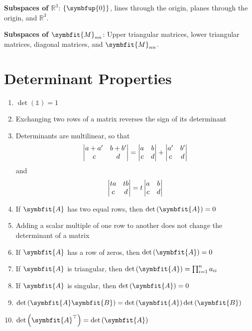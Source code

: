 \documentclass{article}
\begin{document}
\begin{multicols*}{2}
    \textbf{Subspaces of \(\mathbb{R}^3\)}: \(\left\{ \symbfup{0} \right\}\),
    lines through the origin, planes through the origin, and \(\mathbb{R}^3\).

    \textbf{Subspaces of \(\symbfit{M}_{nn}\)}: Upper triangular matrices,
    lower triangular matrices, diagonal matrices, and \(\symbfit{M}_{nn}\).
    \section*{Determinant Properties}
    \begin{enumerate}
        \item \(\det{\left( \mathbb{1} \right)}=1\)
        \item Exchanging two rows of a matrix reverses the sign of its determinant
        \item Determinants are multilinear, so that
              \begin{equation*}
                  \mdet{a+a' & b+b' \\ c & d}
                  = \mdet{a & b \\ c & d}+\mdet{a' & b' \\ c & d}
              \end{equation*}
              and
              \begin{equation*}
                  \mdet{ta & tb \\ c & d}=t\mdet{a & b \\ c & d}
              \end{equation*}
        \item If \(\symbfit{A}\) has two equal rows, then \(\det{\left( \symbfit{A} \right)}=0\)
        \item Adding a scalar multiple of one row to another does not change the determinant of a matrix
        \item If \(\symbfit{A}\) has a row of zeros, then \(\det{\left( \symbfit{A} \right)}=0\)
        \item If \(\symbfit{A}\) is triangular, then \(\det{\left( \symbfit{A} \right)}=\prod_{i=1}^{n} a_{ii}\)
        \item If \(\symbfit{A}\) is singular, then \(\det{\left( \symbfit{A} \right)}=0\)
        \item \(\det{\left( \symbfit{A}\symbfit{B} \right)} = \det{\left( \symbfit{A} \right)}\det{\left( \symbfit{B} \right)}\)
        \item \(\det{\left( \symbfit{A}^\top \right)} = \det{\left( \symbfit{A} \right)}\)
    \end{enumerate}

\end{multicols*}
\end{document}
